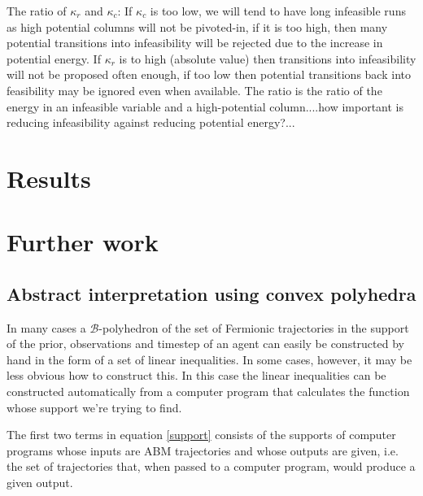 \documentclass{article}
\begin{document}
 The ratio of $\kappa_r$ and $\kappa_c$: If $\kappa_c$ is too low, we will tend to have long infeasible runs as high potential columns will not be pivoted-in, if it is too high, then many potential transitions into infeasibility will be rejected due to the increase in potential energy. If $\kappa_r$ is to high (absolute value) then transitions into infeasibility will not be proposed often enough, if too low then potential transitions back into feasibility may be ignored even when available. The ratio is the ratio of the energy in an infeasible variable and a high-potential column....how important is reducing infeasibility against reducing potential energy?...

\section{Results}

\section{Further work}
\subsection{Abstract interpretation using convex polyhedra}

In many cases a $\mathcal{B}$-polyhedron of the set of Fermionic trajectories in the support of the prior, observations and timestep of an agent can easily be constructed by hand in the form of a set of linear inequalities. In some cases, however, it may be less obvious how to construct this. In this case the linear inequalities can be constructed automatically from a computer program that calculates the function whose support we're trying to find.





The first two terms in equation \eqref{support} consists of the supports of computer programs whose inputs are ABM trajectories and whose outputs are given, i.e. the set of trajectories that, when passed to a computer program, would produce a given output.
\end{document}
